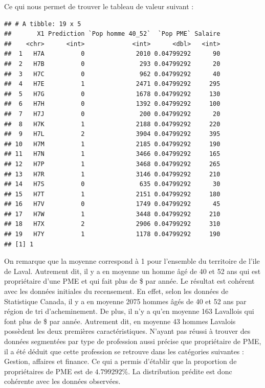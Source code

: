 \documentclass[11pt,french]{article}\usepackage[]{graphicx}\usepackage[]{color}
\makeatletter
\newenvironment{kframe}{%
 \def\at@end@of@kframe{}%
 \ifinner\ifhmode%
  \def\at@end@of@kframe{\end{minipage}}%
  \begin{minipage}{\columnwidth}%
 \fi\fi%
 \def\FrameCommand##1{\hskip\@totalleftmargin \hskip-\fboxsep
 \colorbox{shadecolor}{##1}\hskip-\fboxsep
     \hskip-\linewidth \hskip-\@totalleftmargin \hskip\columnwidth}%
 \MakeFramed {\advance\hsize-\width
   \@totalleftmargin\z@ \linewidth\hsize
   \@setminipage}}%
 {\par\unskip\endMakeFramed%
 \at@end@of@kframe}
\newenvironment{knitrout}{}{} %
\makeatother
\begin{document}
Ce qui nous permet de trouver le tableau de valeur suivant :
\begin{knitrout}
\color{fgcolor}\begin{kframe}
\begin{verbatim}
## # A tibble: 19 x 5
##       X1 Prediction `Pop homme 40_52`  `Pop PME` Salaire
##    <chr>      <int>             <int>      <dbl>   <int>
##  1   H7A          0              2010 0.04799292      90
##  2   H7B          0               293 0.04799292      20
##  3   H7C          0               962 0.04799292      40
##  4   H7E          1              2471 0.04799292     295
##  5   H7G          0              1678 0.04799292     130
##  6   H7H          0              1392 0.04799292     100
##  7   H7J          0               200 0.04799292      20
##  8   H7K          1              2188 0.04799292     220
##  9   H7L          2              3904 0.04799292     395
## 10   H7M          1              2185 0.04799292     190
## 11   H7N          1              3466 0.04799292     165
## 12   H7P          1              3468 0.04799292     265
## 13   H7R          1              3146 0.04799292     210
## 14   H7S          0               635 0.04799292      30
## 15   H7T          1              2151 0.04799292     180
## 16   H7V          0              1749 0.04799292      45
## 17   H7W          1              3448 0.04799292     210
## 18   H7X          2              2906 0.04799292     310
## 19   H7Y          1              1178 0.04799292     190
## [1] 1
\end{verbatim}
\end{kframe}
\end{knitrout}
On remarque que la moyenne correspond à 1 pour l'ensemble du territoire de l'ile de Laval. Autrement dit, il y a en moyenne un homme âgé de 40 et 52 ans qui est propriétaire d'une PME et qui fait plus de  \$ par année. Le résultat est cohérent avec les données initiales du recensement. En effet, selon les données de Statistique Canada, il y a en moyenne 2075 hommes âgés de 40 et 52 ans par région de tri d'acheminement. De plus, il n'y a qu'en moyenne 163 Lavallois qui font plus de  \$ par année. Autrement dit, en moyenne 43 hommes Lavalois possèdent les deux premières caractéristiques. N'ayant pas réussi à trouver des données segmentées par type de profession aussi précise que propriétaire de PME, il a été déduit que cette profession se retrouve dans les catégories suivantes : Gestion,  affaires et finance. Ce qui a permis d'établir que la proportion de propriétaires de PME est de $4.799292 \%$. La distribution prédite est donc cohérente avec les données observées.
\end{document}
